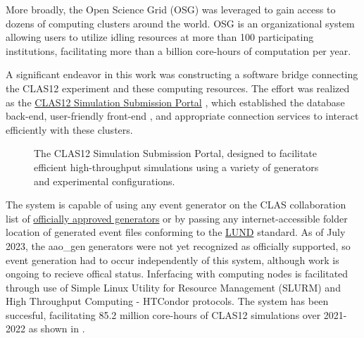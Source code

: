     More broadly, the Open Science Grid (OSG) \parencite{OSG2006OSG} \parencite{Sfiligoi2009TheGlideinWMS} \parencite{Pordes2007TheGrid} was leveraged to gain access to dozens of computing clusters around the world. OSG is an organizational system allowing users to utilize idling resources at more than 100 participating institutions, facilitating more than a billion core-hours of computation per year. 

    A significant endeavor in this work was constructing a software bridge connecting the CLAS12 experiment and these computing resources. The effort was realized as the \href{https://gemc.jlab.org/web_interface/index.php}{CLAS12 Simulation Submission Portal} \parencite{Ungaro2020CLAS12Framework}, which established the database back-end, user-friendly front-end , and appropriate connection services to interact efficiently with these clusters. 
      
    \begin{figure}[H]
        \centering
        \newlength{\imageheight}
        \hfill
        \caption[CLAS12 Simulation Submission Portal]{The CLAS12 Simulation Submission Portal, designed to facilitate efficient high-throughput simulations using a variety of generators and experimental configurations.}\label{fig:clas12_sub_portal}
    \end{figure}

    The system is capable of using any event generator on the CLAS collaboration list of \href{https://github.com/JeffersonLab/clas12-mcgen}{officially approved generators} or by passing any internet-accessible folder location of generated event files conforming to the \href{https://gemc.jlab.org/gemc/html/documentation/generator/lund.html}{LUND} standard. As of July 2023, the aao\_gen generators were not yet recognized as officially supported, so event generation had to occur independently of this system, although work is ongoing to recieve offical status. Inferfacing with computing nodes is facilitated through use of Simple Linux Utility for Resource Management (SLURM) \parencite{Yoo2003SLURM:Management} and High Throughput Computing - HTCondor \parencite{HTCondorTeam2023HTCondor} protocols. The system has been succesful, facilitating 85.2 million core-hours of CLAS12 simulations over 2021-2022 as shown in .
       
